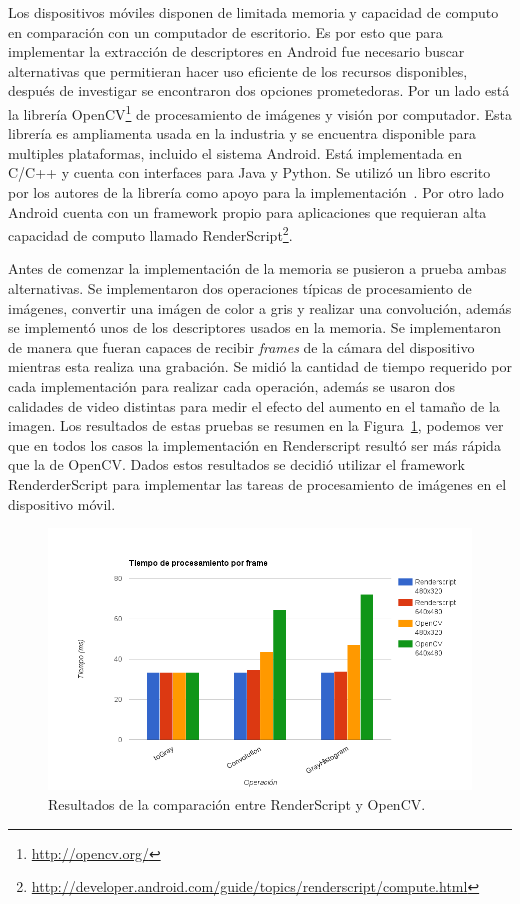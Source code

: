 Los dispositivos móviles disponen de limitada memoria y capacidad de computo en comparación con un computador de escritorio. Es por esto que para implementar la extracción de descriptores en Android fue necesario buscar alternativas que permitieran hacer uso eficiente de los recursos disponibles, después de investigar se encontraron dos opciones prometedoras. Por un lado está la librería OpenCV\footnote{\url{http://opencv.org/}} de procesamiento de imágenes y visión por computador. Esta librería es ampliamenta usada en la industria y se encuentra disponible para multiples plataformas, incluido el sistema Android. Está implementada en C/C++ y cuenta con interfaces para Java y Python. Se utilizó un libro escrito por los autores de la librería como apoyo para la implementación~\cite{opencv}. Por otro lado Android cuenta con un framework propio para aplicaciones que requieran alta capacidad de computo llamado RenderScript\footnote{\url{http://developer.android.com/guide/topics/renderscript/compute.html}}.

Antes de comenzar la implementación de la memoria se pusieron a prueba ambas alternativas. Se implementaron dos operaciones típicas de procesamiento de imágenes, convertir una imágen de color a gris y realizar una convolución, además se implementó unos de los descriptores usados en la memoria. Se implementaron de manera que fueran capaces de recibir \emph{frames} de la cámara del dispositivo mientras esta realiza una grabación. Se midió la cantidad de tiempo requerido por cada implementación para realizar cada operación, además se usaron dos calidades de video distintas para medir el efecto del aumento en el tamaño de la imagen. Los resultados de estas pruebas se resumen en la Figura~\ref{renderscript_vs_opencv}, podemos ver que en todos los casos la implementación en Renderscript resultó ser más rápida que la de OpenCV. Dados estos resultados se decidió utilizar el framework RenderderScript para implementar las tareas de procesamiento de imágenes en el dispositivo móvil. 
    \begin{figure}[!h]
		\centering
		\includegraphics[scale=0.5]{imagenes/cap2/renderscript_vs_opencv.png}
		\caption{Resultados de la comparación entre RenderScript y OpenCV.}
		\label{renderscript_vs_opencv}
	\end{figure}

